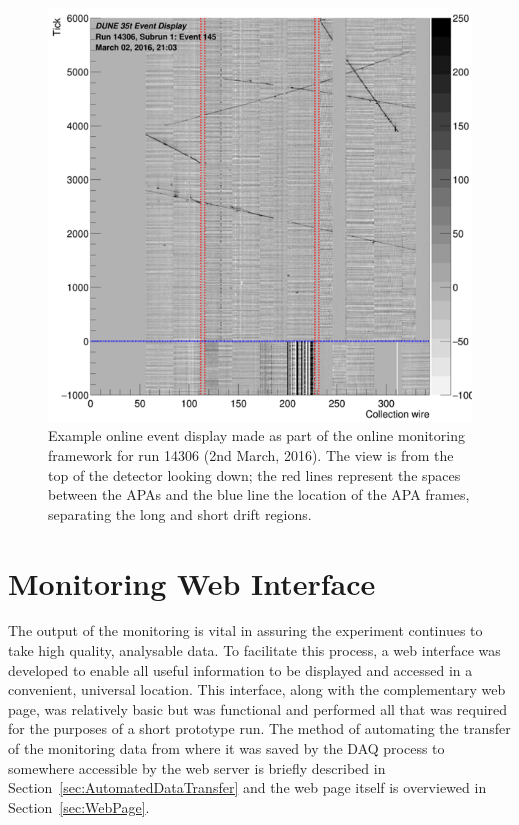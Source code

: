 \begin{figure}
  \centering
  \includegraphics[width=14cm]{evd.png}
  \caption[Example online event display made by the Online Monitoring framework.]{Example online event display made as part of the online monitoring framework for run 14306 (2nd March, 2016).  The view is from the top of the detector looking down; the red lines represent the spaces between the APAs and the blue line the location of the APA frames, separating the long and short drift regions.}
  \label{fig:EVD}
\end{figure}

\section{Monitoring Web Interface}\label{sec:WebInterface}

The output of the monitoring is vital in assuring the experiment continues to take high quality, analysable data.  To facilitate this process, a web interface was developed to enable all useful information to be displayed and accessed in a convenient, universal location.  This interface, along with the complementary web page, was relatively basic but was functional and performed all that was required for the purposes of a short prototype run.  The method of automating the transfer of the monitoring data from where it was saved by the DAQ process to somewhere accessible by the web server is briefly described in Section~\ref{sec:AutomatedDataTransfer} and the web page itself is overviewed in Section~\ref{sec:WebPage}.

